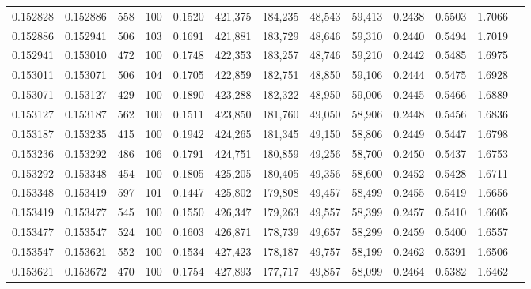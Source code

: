 \begin{tabular}{rrrrrrrrrrrrr}
0.152828 & 0.152886 &   558 & 100 &                                     0.1520 & 421,375 & 184,235 &  48,543 &  59,413 & 0.2438 & 0.5503 & 1.7066 \\
0.152886 & 0.152941 &   506 & 103 &                                     0.1691 & 421,881 & 183,729 &  48,646 &  59,310 & 0.2440 & 0.5494 & 1.7019 \\
0.152941 & 0.153010 &   472 & 100 &                                     0.1748 & 422,353 & 183,257 &  48,746 &  59,210 & 0.2442 & 0.5485 & 1.6975 \\
0.153011 & 0.153071 &   506 & 104 &                                     0.1705 & 422,859 & 182,751 &  48,850 &  59,106 & 0.2444 & 0.5475 & 1.6928 \\
0.153071 & 0.153127 &   429 & 100 &                                     0.1890 & 423,288 & 182,322 &  48,950 &  59,006 & 0.2445 & 0.5466 & 1.6889 \\
0.153127 & 0.153187 &   562 & 100 &                                     0.1511 & 423,850 & 181,760 &  49,050 &  58,906 & 0.2448 & 0.5456 & 1.6836 \\
0.153187 & 0.153235 &   415 & 100 &                                     0.1942 & 424,265 & 181,345 &  49,150 &  58,806 & 0.2449 & 0.5447 & 1.6798 \\
0.153236 & 0.153292 &   486 & 106 &                                     0.1791 & 424,751 & 180,859 &  49,256 &  58,700 & 0.2450 & 0.5437 & 1.6753 \\
0.153292 & 0.153348 &   454 & 100 &                                     0.1805 & 425,205 & 180,405 &  49,356 &  58,600 & 0.2452 & 0.5428 & 1.6711 \\
0.153348 & 0.153419 &   597 & 101 &                                     0.1447 & 425,802 & 179,808 &  49,457 &  58,499 & 0.2455 & 0.5419 & 1.6656 \\
0.153419 & 0.153477 &   545 & 100 &                                     0.1550 & 426,347 & 179,263 &  49,557 &  58,399 & 0.2457 & 0.5410 & 1.6605 \\
0.153477 & 0.153547 &   524 & 100 &                                     0.1603 & 426,871 & 178,739 &  49,657 &  58,299 & 0.2459 & 0.5400 & 1.6557 \\
0.153547 & 0.153621 &   552 & 100 &                                     0.1534 & 427,423 & 178,187 &  49,757 &  58,199 & 0.2462 & 0.5391 & 1.6506 \\
0.153621 & 0.153672 &   470 & 100 &                                     0.1754 & 427,893 & 177,717 &  49,857 &  58,099 & 0.2464 & 0.5382 & 1.6462 \\

\end{tabular}
